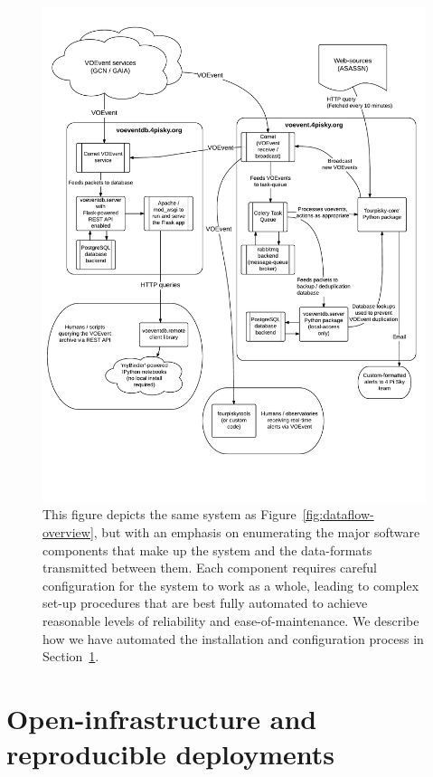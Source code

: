 \documentclass[5p,authoryear]{elsarticle}
\begin{document}
\begin{figure}[htp]
\begin{center}  
  \includegraphics[width=.96\textwidth]{figures/node-layout}
  \caption[Dataflow and components of the 4 Pi Sky hub]{%
  This figure depicts the same system as Figure~\ref{fig:dataflow-overview}, but with an emphasis on enumerating the major software components that make up the system and the data-formats transmitted between them. 
  Each component requires careful configuration for the system to work as a whole, leading to complex set-up procedures that are best fully automated to achieve reasonable levels of reliability and ease-of-maintenance.
  We describe how we have automated the installation and configuration process in Section~\ref{sec:deployment}.
\label{fig:dataflow-detail}
} 
\end{center} 
\end{figure}

\section{Open-infrastructure and reproducible deployments}
\label{sec:deployment}
\end{document}
